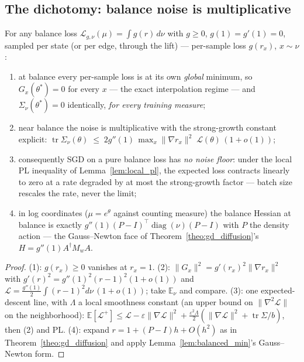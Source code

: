 \subsection{The dichotomy: balance noise is multiplicative}\label{sec:dichotomy}

\begin{proposition}\label{prop:interpolation}
For any balance loss $\mathcal L_{g,\nu}(\mu)=\int g(r)\,d\nu$ with $g\geq0$,
$g(1)=g'(1)=0$, sampled per state (or per edge, through the lift) --- per-sample loss
$g(r_x)$, $x\sim\nu$:
\begin{enumerate}
    \item at balance every per-sample loss is at its own \emph{global} minimum, so
    $G_x(\theta^*)=0$ for every $x$ --- the exact interpolation regime --- and
    $\Sigma_\nu(\theta^*)=0$ identically, \emph{for every training measure};
    \item near balance the noise is multiplicative with the strong-growth constant
    explicit: $\operatorname{tr}\Sigma_\nu(\theta)\;\leq\;
    2g''(1)\,\max_x\|\nabla r_x\|^2\;\mathcal L(\theta)\,(1+o(1))$;
    \item consequently SGD on a pure balance loss has \emph{no noise floor}: under the
    local PL inequality of Lemma~\ref{lem:local_pl}, the expected loss contracts
    linearly to zero at a rate degraded by at most the strong-growth factor
    \citep[the mechanism of][]{vaswani2019fast} --- batch size rescales the rate, never
    the limit;
    \item in log coordinates ($\mu = e^\theta$ against counting measure) the balance
    Hessian at balance is exactly $g''(1)(P-I)^\top\!\operatorname{diag}(\nu)(P-I)$ with
    $P$ the density action --- the Gauss--Newton face of
    Theorem~\ref{theo:gd_diffusion}'s $H = g''(1)A^\dagger M_wA$.
\end{enumerate}
\end{proposition}

\begin{proof}
(1): $g(r_x)\geq0$ vanishes at $r_x=1$. (2): $\|G_x\|^2 = g'(r_x)^2\|\nabla r_x\|^2$
with $g'(r)^2 = g''(1)^2(r-1)^2(1+o(1))$ and $\mathcal L =
\tfrac{g''(1)}2\int(r-1)^2d\nu\,(1+o(1))$; take $\mathbb E_\nu$ and compare.
(3): one expected-descent line, with $\Lambda$ a local smoothness constant (an upper
bound on $\|\nabla^2\mathcal L\|$ on the neighborhood): $\mathbb E[\mathcal L^+]\leq\mathcal L
-\varepsilon\|\nabla\mathcal L\|^2 + \tfrac{\varepsilon^2\Lambda}2
(\|\nabla\mathcal L\|^2 + \operatorname{tr}\Sigma/b)$, then (2) and PL. (4): expand
$r = 1 + (P-I)h + O(h^2)$ as in Theorem~\ref{theo:gd_diffusion} and apply
Lemma~\ref{lem:balanced_min}'s Gauss--Newton form.
\end{proof}

